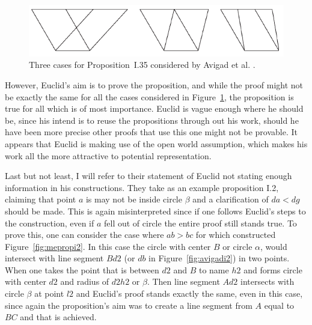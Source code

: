 \documentclass[]{interact}
\theoremstyle{plain}
\theoremstyle{definition}
\theoremstyle{remark}
\begin{document}
\begin{figure}[h]
  \centering
  \includegraphics[scale=0.7]{avigad-fig9-I35}
  \caption[Avigad et al Approach I.35]{Three cases for
    Proposition~I.35 considered by Avigad et al. \cite{AVIGAD2009}.}
  \label{fig:avigadi35}
\end{figure}

However, Euclid's aim is to prove the proposition, and while the proof
might not be exactly the same for all the cases considered in
Figure~\ref{fig:avigadi35}, the proposition is true for all which is
of most importance. Euclid is vague enough where he should be, since
his intend is to reuse the propositions through out his work, should
he have been more precise other proofs that use this one might not be
provable. It appears that Euclid is making use of the open world
assumption, which makes his work all the more attractive to potential
representation.

Last but not least, I will refer to their statement of Euclid not
stating enough information in his constructions. They take as an
example proposition I.2, claiming that point $a$ is may not be inside
circle $\beta$ and a clarification of $da<dg$ should be made. This is
again misinterpreted since if one follows Euclid's steps to the
construction, even if $a$ fell out of circle the entire proof still
stands true. To prove this, one can consider the case where $ab>bc$
for which constructed Figure~\ref{fig:mepropi2}. In this case the
circle with center $B$ or circle $\alpha$, would intersect with line
segment $Bd2$ (or $db$ in Figure~\ref{fig:avigadi2}) in two points.
When one takes the point that is between $d2$ and $B$ to name $h2$ and
forms circle with center $d2$ and radius of $d2h2$ or $\beta$. Then
line segment $Ad2$ intersects with circle $\beta$ at point $l2$ and
Euclid's proof stands exactly the same, even in this case, since again
the proposition's aim was to create a line segment from $A$ equal to
$BC$ and that is achieved.
\end{document}

